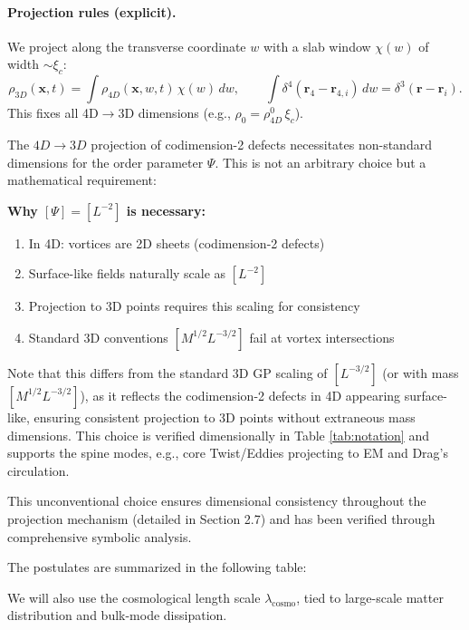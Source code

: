 \paragraph{Projection rules (explicit).} We project along the transverse coordinate $w$ with a slab window $\chi(w)$ of width $\sim\xi_c$:
\[
\rho_{3D}(\mathbf x,t)=\int \rho_{4D}(\mathbf x,w,t)\,\chi(w)\,dw,\qquad
\int\delta^4(\mathbf r_4-\mathbf r_{4,i})\,dw=\delta^3(\mathbf r-\mathbf r_i).
\]
This fixes all 4D$\to$3D dimensions (e.g., $\rho_0=\rho_{4D}^0\,\xi_c$).

The $4D\to3D$ projection of codimension-2 defects necessitates non-standard dimensions for the order parameter $\Psi$. This is not an arbitrary choice but a mathematical requirement:

\textbf{Why $[\Psi] = [L^{-2}]$ is necessary:}
\begin{enumerate}
\item In 4D: vortices are 2D sheets (codimension-2 defects)
\item Surface-like fields naturally scale as $[L^{-2}]$
\item Projection to 3D points requires this scaling for consistency
\item Standard 3D conventions $[M^{1/2} L^{-3/2}]$ fail at vortex intersections
\end{enumerate}

Note that this differs from the standard 3D GP scaling of $[L^{-3/2}]$ (or with mass $[M^{1/2} L^{-3/2}]$), as it reflects the codimension-2 defects in 4D appearing surface-like, ensuring consistent projection to 3D points without extraneous mass dimensions. This choice is verified dimensionally in Table \ref{tab:notation} and supports the spine modes, e.g., core Twist/Eddies projecting to EM and Drag's circulation.

This unconventional choice ensures dimensional consistency throughout the projection mechanism (detailed in Section 2.7) and has been verified through comprehensive symbolic analysis.

\medskip

The postulates are summarized in the following table:

We will also use the cosmological length scale $\lambda_{\text{cosmo}}$, tied to large-scale matter distribution and bulk-mode dissipation.

